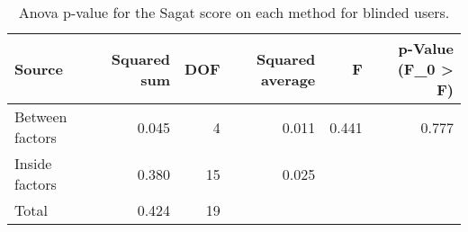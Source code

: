 
\begin{table}[!htb]
\centering
\caption{Anova p-value for the Sagat score on each method for blinded users.}
\label{tab:anova_sagat_avg}
\begin{tabular}{lrrrrr}
\toprule
         Source &  Squared sum &  DOF & Squared average &     F & p-Value (F\_0 > F) \\
\midrule
Between factors &        0.045 &    4 &           0.011 & 0.441 &             0.777 \\
 Inside factors &        0.380 &   15 &           0.025 &       &                   \\
          Total &        0.424 &   19 &                 &       &                   \\
\bottomrule
\end{tabular}
\end{table}

